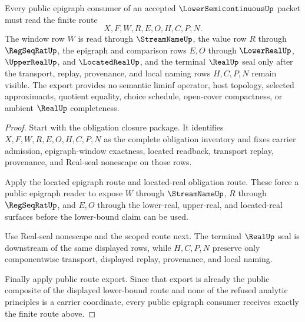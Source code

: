 \begin{theorem}
\label{thm:lowersemicontinuous-public-epigraph-export}
Every public epigraph consumer of an accepted $\LowerSemicontinuousUp$ packet must read the finite route
$$
X,F,W,R,E,O,H,C,P,N .
$$
The window row $W$ is read through $\StreamNameUp$, the value row $R$ through $\RegSeqRatUp$, the epigraph and comparison rows $E,O$ through $\LowerRealUp$, $\UpperRealUp$, and $\LocatedRealUp$, and the terminal $\RealUp$ seal only after the transport, replay, provenance, and local naming rows $H,C,P,N$ remain visible. The export provides no semantic liminf operator, host topology, selected approximants, quotient equality, choice schedule, open-cover compactness, or ambient $\RealUp$ completeness.
\end{theorem}
\begin{proof}
Start with the obligation closure package. It identifies $X,F,W,R,E,O,H,C,P,N$ as the complete obligation inventory and fixes carrier admission, epigraph-window exactness, located readback, transport replay, provenance, and Real-seal nonescape on those rows.

Apply the located epigraph route and located-real obligation route. These force a public epigraph reader to expose $W$ through $\StreamNameUp$, $R$ through $\RegSeqRatUp$, and $E,O$ through the lower-real, upper-real, and located-real surfaces before the lower-bound claim can be used.

Use Real-seal nonescape and the scoped route next. The terminal $\RealUp$ seal is downstream of the same displayed rows, while $H,C,P,N$ preserve only componentwise transport, displayed replay, provenance, and local naming.

Finally apply public route export. Since that export is already the public composite of the displayed lower-bound route and none of the refused analytic principles is a carrier coordinate, every public epigraph consumer receives exactly the finite route above.
\end{proof}

